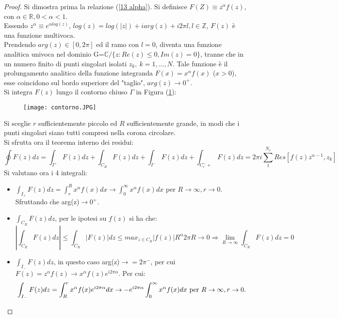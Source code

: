 \documentclass[twoside]{article}
\begin{document}
\begin{proof}
Si dimostra prima la relazione (\ref{13 alpha}). Si definisce $F(Z)\equiv z^\alpha f(z)$, con $\alpha\in\mathds{R},0<\alpha<1$.\\
Essendo $z^\alpha\equiv e^{\alpha log(z)}$, $log(z)=log(|z|)+iarg(z)+i2\pi l, l\in\mathds{Z}$, $F(z)$ è una funzione multivoca.\\
Prendendo $arg(z)\in[0,2\pi]$ ed il ramo con $l=0$, diventa una funzione analitica univoca nel dominio G=$\mathds{C}/\{z:Re(z)\le0,Im(z)=0\}$, tranne che in un numero finito di punti singolari  isolati $z_k, \ k=1,...,N$. Tale funzione è il prolungamento analitico della funzione integranda $F(x)=x^\alpha f(x)$ ($x>0$), esse coincidono sul bordo superiore del "taglio", $arg(z)\to 0^+$.\\
Si integra $F(z)$ lungo il contorno chiuso $\Gamma$ in Figura (\ref{13 figura}):
\begin{figure}[H]\label{13 figura}
    \centering
    \texttt{[image: contorno.JPG]}
\end{figure}
Si sceglie $r$ sufficientemente piccolo ed $R$ sufficientemente grande, in modi che i punti singolari siano tutti compresi nella corona circolare.\\
Si sfrutta ora il teorema interno dei residui:
\begin{equation}
    \oint F(z)dz=\int_{I^+}F(z)dz +\int_{C_R}F(z)dz+\int_{I^-}F(z)dz+\int_{C_r^-+}F(z)dz=2\pi i\sum_1^{N_e}Res[f(z)z^{\alpha-1},z_k]
\end{equation}
Si valutano ora i 4 integrali:
\begin{itemize}
    \item $\int_{I_+}F(z)dz=\int_r^Rx^\alpha f(x)dx\to\int_0^\infty x^\alpha f(x)dx$ per $R\to\infty, r\to 0$.\\
    Sfruttando che arg(z)$\to0^+$.
    \item $\int_{C_R}F(z)dz$, per le ipotesi su $f(z)$ si ha che:
    \begin{equation}
        \left|\int_{C_R}F(z)dz\right|\le\int_{C_R}|F(z)|dz\le max_{z\in C_R}|f(z)|R^\alpha 2\pi R\to 0 \Longrightarrow \lim_{R\to\infty}\int_{C_R}F(z)dz=0
    \end{equation}
    \item $\int_{I_-}F(z)dz$, in questo caso arg(z)$\to =2\pi^-$, per cui $F(z)=z^\alpha f(z)\to x^\alpha f(z)e^{i2\pi\alpha}$. Per cui:
    \begin{equation}
        \int_{I_-}F(z)dz=\int_R^rx^\alpha f(x)e^{i2\pi\alpha}dx\to -e^{i2\pi\alpha}\int_0^\infty x^\alpha f(x)dx \text{ per } R\to\infty, r\to 0.\\

\end{equation}
\end{itemize}
\end{proof}
\end{document}
